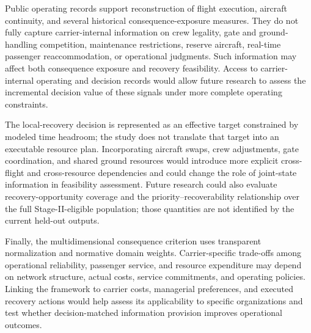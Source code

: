Public operating records support reconstruction of flight execution, aircraft continuity, and several historical consequence-exposure measures. They do not fully capture carrier-internal information on crew legality, gate and ground-handling competition, maintenance restrictions, reserve aircraft, real-time passenger reaccommodation, or operational judgments. Such information may affect both consequence exposure and recovery feasibility. Access to carrier-internal operating and decision records would allow future research to assess the incremental decision value of these signals under more complete operating constraints.

The local-recovery decision is represented as an effective target constrained by modeled time headroom; the study does not translate that target into an executable resource plan. Incorporating aircraft swaps, crew adjustments, gate coordination, and shared ground resources would introduce more explicit cross-flight and cross-resource dependencies and could change the role of joint-state information in feasibility assessment. Future research could also evaluate recovery-opportunity coverage and the priority--recoverability relationship over the full Stage-II-eligible population; those quantities are not identified by the current held-out outputs.

Finally, the multidimensional consequence criterion uses transparent normalization and normative domain weights. Carrier-specific trade-offs among operational reliability, passenger service, and resource expenditure may depend on network structure, actual costs, service commitments, and operating policies. Linking the framework to carrier costs, managerial preferences, and executed recovery actions would help assess its applicability to specific organizations and test whether decision-matched information provision improves operational outcomes.
